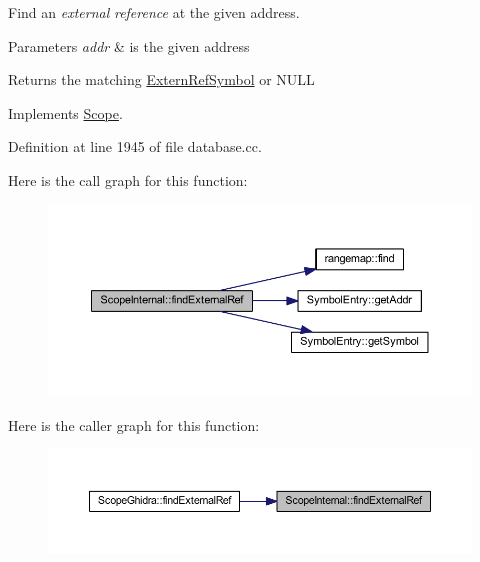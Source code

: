 Find an {\itshape external} {\itshape reference} at the given address. 


\begin{DoxyParams}{Parameters}
{\em addr} & is the given address \\
\hline
\end{DoxyParams}
\begin{DoxyReturn}{Returns}
the matching \mbox{\hyperlink{class_extern_ref_symbol}{Extern\+Ref\+Symbol}} or N\+U\+LL 
\end{DoxyReturn}


Implements \mbox{\hyperlink{class_scope_af69e0f77b621a3ba6436f8a1c0010d1c}{Scope}}.



Definition at line 1945 of file database.\+cc.

Here is the call graph for this function\+:
\nopagebreak
\begin{figure}[H]
\begin{center}
\leavevmode
\includegraphics[width=350pt]{class_scope_internal_a7e440965cfb5642bcc751a622e5ec58d_cgraph}
\end{center}
\end{figure}
Here is the caller graph for this function\+:
\nopagebreak
\begin{figure}[H]
\begin{center}
\leavevmode
\includegraphics[width=350pt]{class_scope_internal_a7e440965cfb5642bcc751a622e5ec58d_icgraph}
\end{center}
\end{figure}
\mbox{\label{class_scope_internal_a03a52c629c51ad660eec8d10cf7f92aa}} 

